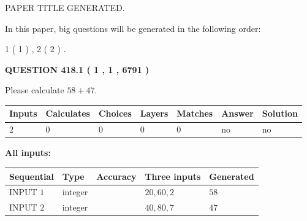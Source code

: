 \documentclass[12pt]{article}
\begin{document}
   
\vspace{0.2in}
   
   
   
   
   
   
   
   
 \vspace{0.2in}
 
 
 
 
   
   
 PAPER TITLE GENERATED.
   
   
   
\vspace{0.2in}
   
In this paper, big questions will be generated in the following order: 
   
   
   1 ( 1 )
 ,
   2 ( 2 )
 .
  
\vspace{0.2in}
  
{\textbf{\Large{QUESTION
418.1 
 ( 1 , 1 , 6791 )
}}}
  
  
 
Please calculate $ %
58 +  %
47 $.
 
 
   
   
   
   
\noindent\begin{tabular}{|l|l|l|l|l|l|l|}
 \hline
Inputs & Calculates & Choices & Layers & Matches & Answer & Solution \\ \hline
 2  & 
 0  & 
 0
  & 
 0  & 
 0  & 
  no & 
  no 
  \\ \hline
 \end{tabular}
   
   
   
   
\noindent{}
   
   
   
   
\noindent\vspace{0.1in}\hspace{-0.08in} {\textbf{\Large{All inputs: }}}
   
   
  
  
\noindent\begin{tabular}{|l|l|l|l|l|}
\hline
 Sequential & Type & Accuracy & Three inputs & Generated \\ 
\hline
 
 
  INPUT $  1 $ & integer &  & $
 20
 , 
 60
 , 
 2
 $ & $ 58 $ 
 \\  \hline  
 
 
  INPUT $  2 $ & integer &  & $
 40
 , 
 80
 , 
 7
 $ & $ 47 $ 
 \\  \hline  
 \end{tabular}
   
\end{document}
